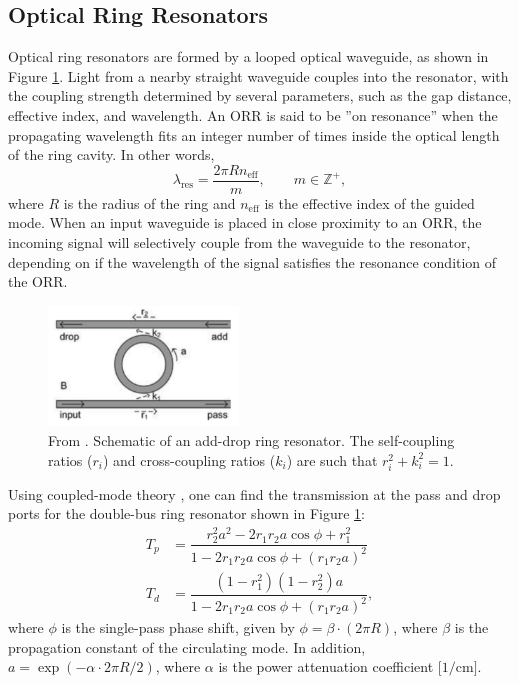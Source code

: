 \documentclass[letterpaper, 10 pt, conference]{ieeeconf}
\begin{document}
\subsection*{Optical Ring Resonators}

Optical ring resonators are formed by a looped optical waveguide, as shown in Figure \ref{fig:1}. Light from a nearby straight waveguide couples into the resonator, with the coupling strength determined by several parameters, such as the gap distance, effective index, and wavelength. An ORR is said to be ''on resonance'' when the propagating wavelength fits an integer number of times inside the optical length of the ring cavity. In other words,
\begin{equation}
    \lambda_\text{res} = \frac{2\pi R n_\text{eff}}{m}, \qquad m \in \mathbb{Z}^+,
    \label{eq:lamdares}
\end{equation}
where $R$ is the radius of the ring and $n_\text{eff}$ is the effective index of the guided mode. When an input waveguide is placed in close proximity to an ORR, the incoming signal will selectively couple from the waveguide to the resonator, depending on if the wavelength of the signal satisfies the resonance condition of the ORR.

\begin{figure}[!ht]
    \centering
    \includegraphics[width = 0.45\textwidth]{add_drop_RR.png}
    \caption{From \cite{SIPORR}. Schematic of an add-drop ring resonator. The self-coupling ratios ($r_i$) and cross-coupling ratios ($k_i$) are such that $r_i^2+k_i^2=1$.}
    \label{fig:1}
\end{figure} 

Using coupled-mode theory \cite{photonicdevices}, one can find the transmission at the pass and drop ports for the double-bus ring resonator shown in Figure \ref{fig:1}:
\begin{align}
    T_p &= \dfrac{r_2^2a^2-2r_1r_2a\cos\phi + r_1^2}{1-2r_1r_2a\cos\phi + (r_1r_2a)^2} \\
    T_d &= \dfrac{(1-r_1^2)(1-r_2^2)a}{1-2r_1r_2a\cos\phi + (r_1r_2a)^2},
\end{align}
where $\phi$ is the single-pass phase shift, given by $\phi = \beta \cdot (2\pi R)$, where $\beta$ is the propagation constant of the circulating mode. In addition, $a = \exp(-\alpha \cdot 2\pi R/2)$, where $\alpha$ is the power attenuation coefficient $[1/$cm$]$.
\end{document}
